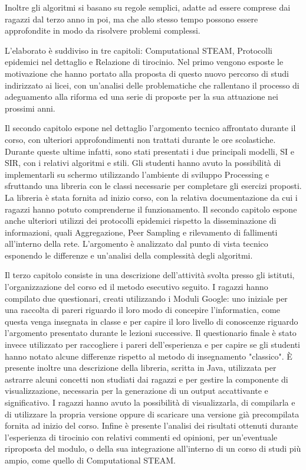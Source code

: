 Inoltre gli algoritmi si basano su regole semplici, adatte ad essere comprese dai ragazzi dal terzo anno in poi, ma che allo stesso tempo possono essere approfondite in modo da risolvere problemi complessi. 

L'elaborato è suddiviso in tre capitoli: Computational STEAM, Protocolli epidemici nel dettaglio e Relazione di tirocinio. Nel primo vengono esposte le motivazione che hanno portato alla proposta di questo nuovo percorso di studi indirizzato ai licei, con un'analisi delle problematiche che rallentano il processo di adeguamento alla riforma ed una serie di proposte per la sua attuazione nei prossimi anni. 

Il secondo capitolo espone nel dettaglio l'argomento tecnico affrontato durante il corso, con ulteriori approfondimenti non trattati durante le ore scolastiche. Durante queste ultime infatti, sono stati presentati i due principali modelli, SI e SIR, con i relativi algoritmi e stili. Gli studenti hanno avuto la possibilità di implementarli su schermo utilizzando l'ambiente di sviluppo Processing e sfruttando una libreria con le classi necessarie per completare gli esercizi proposti. La libreria è stata fornita ad inizio corso, con la relativa documentazione da cui i ragazzi hanno potuto comprenderne il funzionamento. Il secondo capitolo espone anche ulteriori utilizzi dei protocolli epidemici rispetto la disseminazione di informazioni, quali Aggregazione, Peer Sampling e rilevamento di fallimenti all'interno della rete. L'argomento è analizzato dal punto di vista tecnico esponendo le differenze e un'analisi della complessità degli algoritmi.

Il terzo capitolo consiste in una descrizione dell'attività svolta presso gli istituti, l'organizzazione del corso ed il metodo esecutivo seguito. I ragazzi hanno compilato due questionari, creati utilizzando i Moduli Google: uno iniziale per una raccolta di pareri riguardo il loro modo di concepire l'informatica, come questa venga insegnata in classe e per capire il loro livello di conoscenze riguardo l'argomento presentato durante le lezioni successive. Il questionario finale è stato invece utilizzato per raccogliere i pareri dell'esperienza e per capire se gli studenti hanno notato alcune differenze rispetto al metodo di insegnamento "classico". È presente inoltre una descrizione della libreria, scritta in Java, utilizzata per astrarre alcuni concetti non studiati dai ragazzi e per gestire la componente di visualizzazione, necessaria per la generazione di un output accattivante e significativo. I ragazzi hanno avuto la possibilità di visualizzarla, di compilarla e di utilizzare la propria versione oppure di scaricare una versione già precompilata fornita ad inizio del corso. Infine è presente l'analisi dei risultati ottenuti durante l'esperienza di tirocinio con relativi commenti ed opinioni, per un'eventuale riproposta del modulo, o della sua integrazione all'interno di un corso di studi più ampio, come quello di Computational STEAM.

